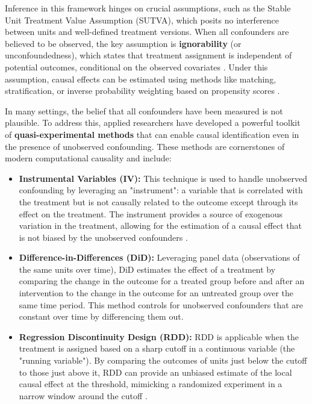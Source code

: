 {{Inference in this framework hinges on crucial assumptions, such as the Stable Unit Treatment Value Assumption (SUTVA), which posits no interference between units and well-defined treatment versions. When all confounders are believed to be observed, the key assumption is \textbf{ignorability} (or unconfoundedness), which states that treatment assignment is independent of potential outcomes, conditional on the observed covariates \cite{rosenbaum1983central}. Under this assumption, causal effects can be estimated using methods like matching, stratification, or inverse probability weighting based on propensity scores \cite{rosenbaum1983central}.

In many settings, the belief that all confounders have been measured is not plausible. To address this, applied researchers have developed a powerful toolkit of \textbf{quasi-experimental methods} that can enable causal identification even in the presence of unobserved confounding. These methods are cornerstones of modern computational causality and include:
\begin{itemize}
    \item \textbf{Instrumental Variables (IV):} This technique is used to handle unobserved confounding by leveraging an "instrument": a variable that is correlated with the treatment but is not causally related to the outcome except through its effect on the treatment. The instrument provides a source of exogenous variation in the treatment, allowing for the estimation of a causal effect that is not biased by the unobserved confounders \cite{angrist1996identification}.
    \item \textbf{Difference-in-Differences (DiD):} Leveraging panel data (observations of the same units over time), DiD estimates the effect of a treatment by comparing the change in the outcome for a treated group before and after an intervention to the change in the outcome for an untreated group over the same time period. This method controls for unobserved confounders that are constant over time by differencing them out\cite{callaway2021difference}.
    \item \textbf{Regression Discontinuity Design (RDD):} RDD is applicable when the treatment is assigned based on a sharp cutoff in a continuous variable (the "running variable"). By comparing the outcomes of units just below the cutoff to those just above it, RDD can provide an unbiased estimate of the local causal effect at the threshold, mimicking a randomized experiment in a narrow window around the cutoff \cite{imbens2008regression}.
\end{itemize}

}}

